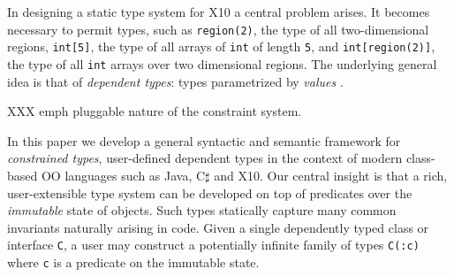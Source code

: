 \documentclass[nocopyrightspace,preprint,9pt]{sigplanconf}
\newcommand\Xten{{X10}}
\newcommand\java{{Java}}
\newcommand\csharp{{C$\sharp$}}
\begin{document}
In designing a static type system for \Xten{} a central problem
arises. It becomes necessary to permit types, such as {\tt region(2)},
the type of all two-dimensional regions, {\tt int[5]}, the type of
all arrays of {\tt int} of length {\tt 5}, and {\tt int[region(2)]},
the type of all {\tt int} arrays over two dimensional regions.
The underlying
general idea is that of {\em dependent types}: types
parametrized by {\em values} \cite{xi99dependent}.

XXX emph pluggable nature of the constraint system.


In this paper we develop a general syntactic and semantic framework
for {\em constrained types}, user-defined dependent types
in the context of modern class-based
OO languages such as \java{}, \csharp{} and \Xten{}. Our central
insight is that a rich, user-extensible type system can be developed
on top of predicates over the {\em immutable} state of objects. Such
types statically capture many common invariants naturally arising in
code. Given a single dependently typed class or interface {\tt C}, a
user may construct a potentially infinite family of types {\tt C(:c)}
where {\tt c} is a predicate on the immutable state.

%
%
%
%
%
\end{document}
